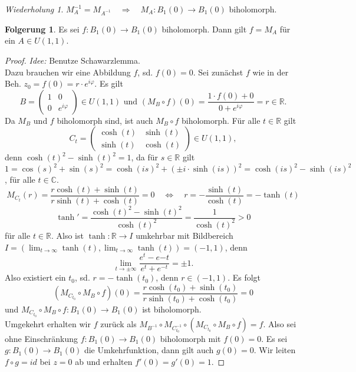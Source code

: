 \documentclass[11pt,titlepage]{article}
\theoremstyle{definition}
\newtheorem{corollary}[theorem]{Folgerung}
\theoremstyle{remark}
\newtheorem*{repetition}{Wiederholung}
\begin{document}
	\begin{repetition}
		$M_{A}^{-1} =M_{A^{-1}} \quad\Rightarrow\quad M_A :B_1(0)\to B_1(0)$ biholomorph.
	\end{repetition}
	
	\begin{corollary}
		Es sei $f:B_1(0)\to B_1(0)$ biholomorph. Dann gilt $f=M_A$ für ein $A\in U(1,1)$.
	\end{corollary}
	
	\begin{proof}
		\textsl{Idee:} Benutze Schawarzlemma. \\
		Dazu brauchen wir eine Abbildung $f$, sd. $f(0)=0$. Sei zunächst $f$ wie in der Beh. 
		$z_0 =f(0)=r\cdot e^{i\varphi}$. Es gilt
		\[ B=\begin{pmatrix}1&0\\0&e^{i\varphi}\end{pmatrix}\in U(1,1) \text{   und   } 
		(M_B \circ f)(0)=\frac{1\cdot f(0)+0}{0+e^{i\varphi}}=r\in\mathbb{R}. \]
		Da $M_B$ und $f$ biholomorph sind, ist auch $M_B \circ f$ biholomorph. Für alle 
		$t\in\mathbb{R}$ gilt 
		\[C_t =\begin{pmatrix}\cosh(t)&\sinh(t)\\ \sinh(t)&\cosh(t)\end{pmatrix}\in U(1,1),\]
		denn $\cosh(t)^2 -\sinh(t)^2 =1$, da für $s\in\mathbb{R}$ gilt 
		$1=\cos(s)^2+\sin(s)^2=\cosh(is)^2+(\pm i\cdot \sinh(is))^2 =\cosh(is)^2-\sinh(is)^2$, für alle 
		$t\in\mathbb{C}$.
		\[ M_{C_t}(r)=\frac{r \cosh(t)+\sinh(t)}{r\sinh(t)+\cosh(t)}=0 \quad\Leftrightarrow\quad 
		r=-\frac{\sinh(t)}{\cosh(t)}=-\tanh(t) \]
		\[\tanh' =\frac{\cosh(t)^2 -\sinh(t)^2}{\cosh(t)^2}=\frac{1}{\cosh(t)^2}>0 \]
		für alle $t\in\mathbb{R}$. Also ist $\tanh :\mathbb{R}\to I$ umkehrbar mit Bildbereich 
		$I=(\lim_{t\to\infty}\tanh(t) ,\lim_{t\to\infty} \tanh(t))=(-1,1)$, denn 
		\[ \lim_{t\to \pm \infty} \frac{e^t -e{-t}}{e^t +e^{-t}}=\pm 1. \]
		Also existiert ein $t_0$, sd. $r=-\tanh(t_0)$, denn $r\in (-1,1)$. Es folgt
		\[(M_{C_{t_0}}\circ M_B \circ f)(0)=\frac{r\cosh(t_0)+\sinh(t_0)}{r\sinh(t_0)+\cosh(t_0)}=0 \]
		und $M_{C_{t_0}}\circ M_B\circ f:B_1(0)\to B_1(0)$ ist biholomorph. \\
		Umgekehrt erhalten wir $f$ zurück als $M_{B^{-1}}\circ M_{C_{t_0}^{-1}}\circ 
		(M_{C_{t_0}}\circ M_B \circ f)=f$. Also sei ohne Einschränkung $f:B_1(0)\to B_1(0)$ 
		biholomorph mit $f(0)=0$. Es sei $g:B_1(0)\to B_1(0)$ die Umkehrfunktion, dann gilt auch 
		$g(0)=0$. Wir leiten $f\circ g=id$ bei $z=0$ ab und erhalten $f'(0)=g'(0)=1$. 

\end{proof}
\end{document}
